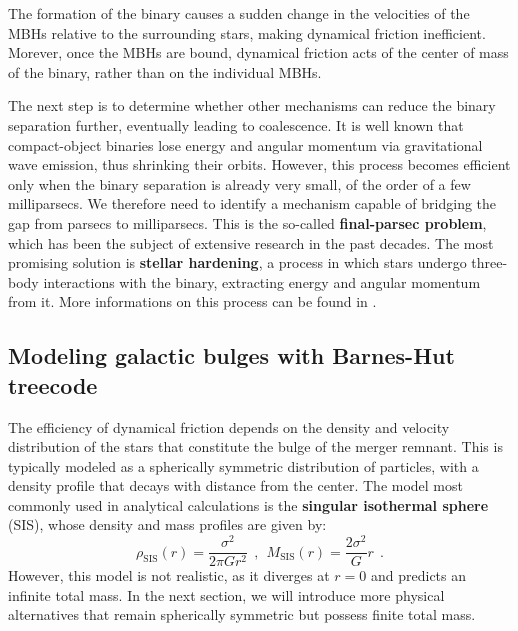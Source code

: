 \documentclass[fleqn,usenatbib]{mnras}
\begin{document}
The formation of the binary causes a sudden change in the velocities of the MBHs relative to the surrounding stars, making dynamical friction inefficient.
Morever, once the MBHs are bound, dynamical friction acts of the center of mass of the binary, rather than on the individual MBHs.

The next step is to determine whether other mechanisms can reduce the binary separation further, eventually leading to coalescence.
It is well known that compact-object binaries lose energy and angular momentum via gravitational wave emission, thus shrinking their orbits.
However, this process becomes efficient only when the binary separation is already very small, of the order of a few milliparsecs.
We therefore need to identify a mechanism capable of bridging the gap from parsecs to milliparsecs.
This is the so-called \textbf{final-parsec problem}, which has been the subject of extensive research in the past decades.
The most promising solution is \textbf{stellar hardening}, a process in which stars undergo three-body interactions with the binary, extracting energy and angular momentum from it.
More informations on this process can be found in \cite{Quinlan1996}.

\subsection{Modeling galactic bulges with Barnes-Hut treecode}\label{sec:introduction_models}
The efficiency of dynamical friction depends on the density and velocity distribution of the stars that constitute the bulge of the merger remnant.
This is typically modeled as a spherically symmetric distribution of particles, with a density profile that decays with distance from the center.
The model most commonly used in analytical calculations is the \textbf{singular isothermal sphere} (SIS), whose density and mass profiles are given by:
\begin{equation}
    \rho_\text{SIS}(r) = \dfrac{\sigma^2}{2 \pi G r^2} \:\: , \:\: M_\text{SIS}(r) = \dfrac{2 \sigma^2}{G} r \:\:.
    \label{eq:sis_density}
\end{equation}
However, this model is not realistic, as it diverges at $r=0$ and predicts an infinite total mass.
In the next section, we will introduce more physical alternatives that remain spherically symmetric but possess finite total mass.
\end{document}
